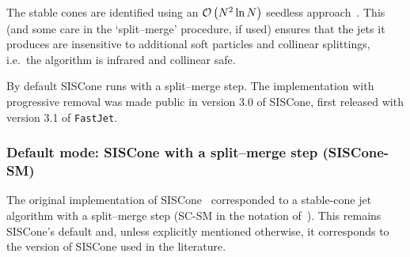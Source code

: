 \documentclass[12pt,a4]{article}
\newcommand{\fastjet}{\texttt{FastJet}\xspace}
\newcommand{\order}[1]{{\cal O}\left(#1\right)}
\begin{document}
The stable cones are identified using an $\order{N^2 \ln N}$ seedless
approach~\cite{SISCone}. This (and some care in the `split--merge'
procedure, if used) ensures that the jets it produces are insensitive
to additional soft particles and collinear splittings, i.e.\ the
algorithm is infrared and collinear safe.

By default SISCone runs with a split--merge step.
%
The implementation with progressive removal was made public in version
3.0 of SISCone, first released with version 3.1 of \fastjet.

% 
% 

\subsubsection{Default mode: SISCone with a split--merge step (SISCone-SM)}

The original implementation of SISCone~\cite{SISCone} corresponded to
a stable-cone jet algorithm with a split--merge step (SC-SM in the
notation of~\cite{Salam:2009jx}).
%
This remains SISCone's default and, unless explicitly mentioned
otherwise, it corresponds to the version of SISCone used in the literature.

\end{document}
